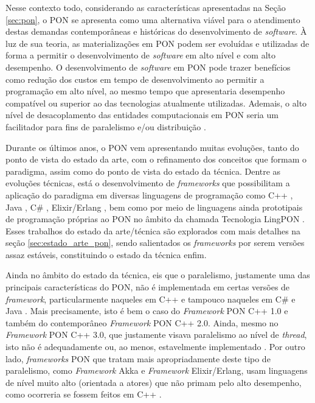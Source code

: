Nesse contexto todo, considerando as características apresentadas na Seção
\ref{sec:pon}, o PON se apresenta como uma alternativa viável para o atendimento
destas demandas contemporâneas e históricas do desenvolvimento de
\textit{software}. À luz de sua teoria, as materializações em PON podem ser
evoluídas e utilizadas de forma a permitir o desenvolvimento de
\textit{software} em alto nível e com alto desempenho. O desenvolvimento de
\textit{software} em PON pode trazer benefícios como redução dos custos em tempo
de desenvolvimento ao permitir a programação em alto nível, ao mesmo tempo que
apresentaria desempenho compatível ou superior ao das tecnologias atualmente
utilizadas. Ademais, o alto nível de desacoplamento das entidades computacionais
em PON seria um facilitador para fins de paralelismo e/ou distribuição
\cite{simao_2012a,ronszcka_2017,doc_ronszcka_2019}.

Durante os últimos anos, o PON vem apresentando muitas evoluções, tanto do ponto
de vista do estado da arte, com o refinamento dos conceitos que formam o
paradigma, assim como do ponto de vista do estado da técnica. Dentre as
evoluções técnicas, está o desenvolvimento de \textit{frameworks} que
possibilitam a aplicação do paradigma em diversas linguagens de programação como
C++ \cite{msc_Banaszewski_2009,msc_Ronszcka_2012}, Java \cite{henzen_2015}, C\#
\cite{henzen_2015,msc_oliveira_2019}, Elixir/Erlang \cite{msc_negrini_2019}, bem
como por meio de linguagens ainda prototipais de programação próprias ao PON no
âmbito da chamada Tecnologia LingPON \cite{doc_ronszcka_2019}. Esses trabalhos
do estado da arte/técnica são explorados com mais detalhes na seção
\ref{sec:estado_arte_pon}, sendo salientados os \textit{frameworks} por serem
versões assaz estáveis, constituindo o estado da técnica enfim.

Ainda no âmbito do estado da técnica, eis que o paralelismo, justamente uma das
principais características do PON, não é implementada em certas versões de
\textit{framework}, particularmente naqueles em C++ e tampouco naqueles em C\# e
Java \cite{doc_ronszcka_2019}. Mais precisamente, isto é bem o caso do
\textit{Framework} PON C++ 1.0 e também do contemporâneo \textit{Framework} PON
C++ 2.0. Ainda, mesmo no \textit{Framework} PON C++ 3.0, que justamente visava
paralelismo ao nível de \textit{thread}, isto não é adequadamente ou, ao menos,
estavelmente implementado \cite{doc_ronszcka_2019,doc_Schutz_2019}. Por outro
lado, \textit{frameworks} PON que tratam mais apropriadamente deste tipo de
paralelismo, como \textit{Framework} Akka e \textit{Framework} Elixir/Erlang,
usam linguagens de nível muito alto (orientada a atores) que não primam pelo
alto desempenho, como ocorreria se fossem feitos em C++
\cite{doc_ronszcka_2019,msc_negrini_2019,negrini_2019,negrini_2019_2}.

